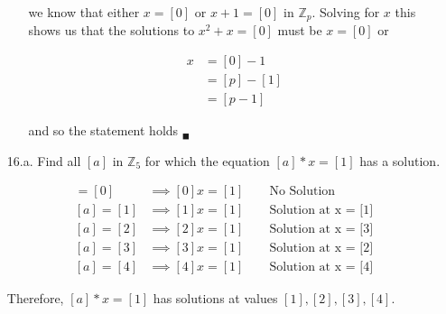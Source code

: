 \documentclass{article}
\begin{document}
\begin{enumerate}
\begin{enumerate}
						we know that either $x = [0]$ or $x + 1 = [0]$ in $\mathbb{Z}_p$. 
						Solving for $x$ this shows us that the solutions to $x^2 + x = [0]$ must be
						$x = [0]$ or 

							\begin{align*}
								x & = [0] - 1 \\
								  & = [p] - [1] \\
								  & = [p - 1]
							\end{align*}

						and so the statement holds $_{\blacksquare}$

			\end{enumerate}
		
		\item [16.a.] Find all $[a]$ in $\mathbb{Z}_5$ for which the equation $[a] * x = [1]$ has a
				solution.

				\begin{align*}
					[a] = [0] & \implies [0]x = [1] \qquad \text{No Solution} \\
					[a] = [1] & \implies [1]x = [1] \qquad \text{Solution at x = [1]} \\
					[a] = [2] & \implies [2]x = [1] \qquad \text{Solution at x = [3]} \\
					[a] = [3] & \implies [3]x = [1] \qquad \text{Solution at x = [2]} \\
					[a] = [4] & \implies [4]x = [1] \qquad \text{Solution at x = [4]} 
				\end{align*}

				Therefore, $[a] * x = [1]$ has solutions at values $[1], [2], [3], [4]$.

	\end{enumerate}

	\vspace{5mm}
\end{document}
